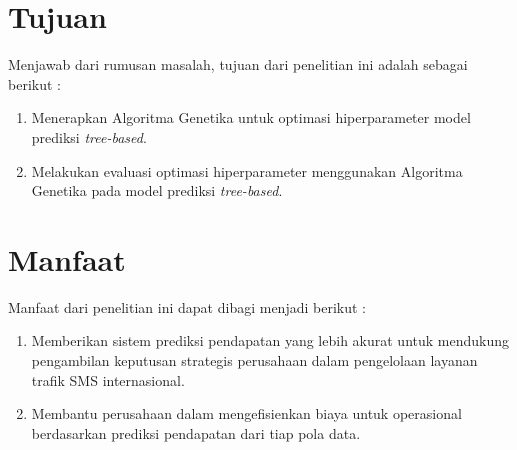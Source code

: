     \section{Tujuan}\label{sec:purpose}
    Menjawab dari rumusan masalah, tujuan dari penelitian ini adalah sebagai berikut : 
        \begin{enumerate}
            
            \item Menerapkan Algoritma Genetika untuk optimasi hiperparameter model prediksi \textit{tree-based}.
            
            \item Melakukan evaluasi optimasi hiperparameter menggunakan Algoritma Genetika pada model prediksi \textit{tree-based}.
        \end{enumerate}

    \section{Manfaat}\label{sec:benefit}
    Manfaat dari penelitian ini dapat dibagi menjadi berikut :
        \begin{enumerate}
                \item Memberikan sistem prediksi pendapatan yang lebih akurat untuk mendukung pengambilan keputusan strategis perusahaan dalam pengelolaan layanan trafik SMS internasional.
                \item Membantu perusahaan dalam mengefisienkan biaya untuk operasional berdasarkan prediksi pendapatan dari tiap pola data.
        \end{enumerate}
